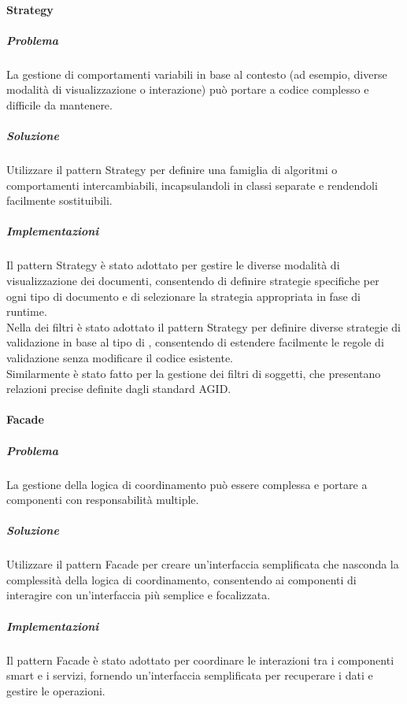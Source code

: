     \paragraph{Strategy}
    \subparagraph{Problema}
        La gestione di comportamenti variabili in base al contesto (ad esempio, diverse modalità di visualizzazione o interazione) può portare a codice complesso e difficile da mantenere.
    \subparagraph{Soluzione}
        Utilizzare il pattern Strategy per definire una famiglia di algoritmi o comportamenti intercambiabili, incapsulandoli in classi separate e rendendoli facilmente sostituibili.
    \subparagraph{Implementazioni}
        Il pattern Strategy è stato adottato per gestire le diverse modalità di visualizzazione dei documenti, consentendo di definire strategie specifiche per ogni tipo di documento e di selezionare la strategia appropriata in fase di runtime.
        \\ Nella  dei filtri è stato adottato il pattern Strategy per definire diverse strategie di validazione in base al tipo di , consentendo di estendere facilmente le regole di validazione senza modificare il codice esistente.\\
        Similarmente è stato fatto per la gestione dei filtri di soggetti, che presentano relazioni precise definite dagli standard AGID.

    \paragraph{Facade}
    \subparagraph{Problema}
        La gestione della logica di coordinamento può essere complessa e portare a componenti con responsabilità multiple.
    \subparagraph{Soluzione}
        Utilizzare il pattern Facade per creare un'interfaccia semplificata che nasconda la complessità della logica di coordinamento, consentendo ai componenti di interagire con un'interfaccia più semplice e focalizzata.
    \subparagraph{Implementazioni}
        Il pattern Facade è stato adottato per coordinare le interazioni tra i componenti smart e i servizi, fornendo un'interfaccia semplificata per recuperare i dati e gestire le operazioni.

